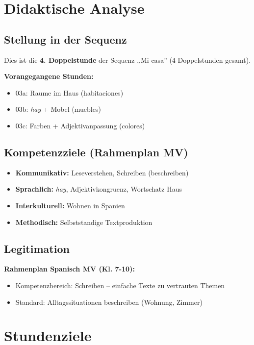 \documentclass[11pt,a4paper]{article}
\newcommand{\reihenthema}{Mi casa}
\begin{document}
\section{Didaktische Analyse}

\subsection{Stellung in der Sequenz}
Dies ist die \textbf{4. Doppelstunde} der Sequenz ,,\reihenthema'' (4 Doppelstunden gesamt).

\textbf{Vorangegangene Stunden:}
\begin{itemize}
    \item 03a: Raume im Haus (habitaciones)
    \item 03b: \textit{hay} + Mobel (muebles)
    \item 03c: Farben + Adjektivanpassung (colores)
\end{itemize}

\subsection{Kompetenzziele (Rahmenplan MV)}
\begin{itemize}
    \item \textbf{Kommunikativ:} Leseverstehen, Schreiben (beschreiben)
    \item \textbf{Sprachlich:} \textit{hay}, Adjektivkongruenz, Wortschatz Haus
    \item \textbf{Interkulturell:} Wohnen in Spanien
    \item \textbf{Methodisch:} Selbststandige Textproduktion
\end{itemize}

\subsection{Legitimation}
\textbf{Rahmenplan Spanisch MV (Kl. 7-10):}
\begin{itemize}
    \item Kompetenzbereich: Schreiben -- einfache Texte zu vertrauten Themen
    \item Standard: Alltagssituationen beschreiben (Wohnung, Zimmer)
\end{itemize}

\section{Stundenziele}
\end{document}
